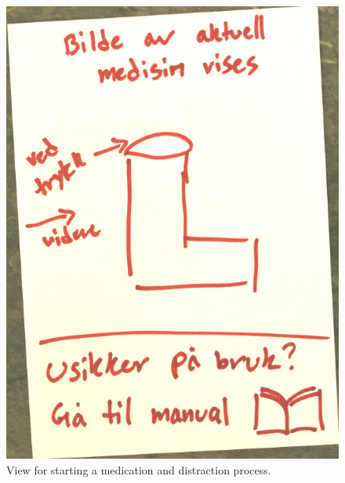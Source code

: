 \begin{figure}
\begin{minipage}[b]{0.46\linewidth}
		\includegraphics[width=0.34\paperwidth]{Pictures/DesignWorkshop/MedicationView}
	\caption[Start medication view from design workshop]{View for starting a medication and distraction process.}
	\label{fig:dwMediationView}
	\end{minipage}
\end{figure}

% 

